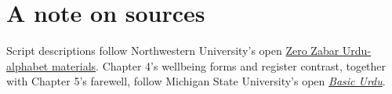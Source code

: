 
\backmatter





\chapter*{A note on sources}

Script descriptions follow Northwestern University's open
\href{https://openbooks.library.northwestern.edu/zerozabar/chapter/the-urdu-alphabet/}%
{Zero Zabar Urdu-alphabet materials}. Chapter 4's wellbeing forms and register
contrast, together with Chapter 5's farewell, follow Michigan State University's
open \href{https://openbooks.lib.msu.edu/urdu/chapter/2-2/}{\emph{Basic Urdu}}.




